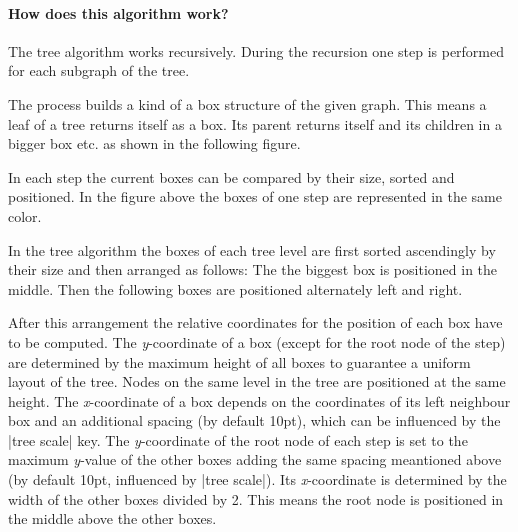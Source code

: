 \paragraph{How does this algorithm work?}
The tree algorithm works recursively. During the recursion one step is performed for each subgraph of the tree. 

The process builds a kind of a box structure of the given graph. This means a leaf of a tree returns itself as a box. Its parent returns itself and its children in a bigger box etc. as shown in the following figure.

\begin{quote}
\end{quote}

In each step the current boxes can be compared by their size, sorted and positioned. In the figure above the boxes of one step are represented in the same color.

In the tree algorithm the boxes of each tree level are first sorted ascendingly by their size and then arranged as follows: The the biggest box is positioned in the middle. Then the following boxes are positioned alternately left and right.

After this arrangement the relative coordinates for the position of each box have to be computed. The \emph{y}-coordinate of a box (except for the root node of the step) are determined by the maximum height of all boxes to guarantee a uniform layout of the tree. Nodes on the same level in the tree are positioned at the same height. The \emph{x}-coordinate of a box depends on the coordinates of its left neighbour box and an additional spacing (by default 10pt), which can be influenced by the |tree scale| key. The \emph{y}-coordinate of the root node of each step is set to the maximum \emph{y}-value of the other boxes adding the same spacing meantioned above (by default 10pt, influenced by |tree scale|). Its \emph{x}-coordinate is determined by the width of the other boxes divided by 2. This means the root node is positioned in the middle above the other boxes.

